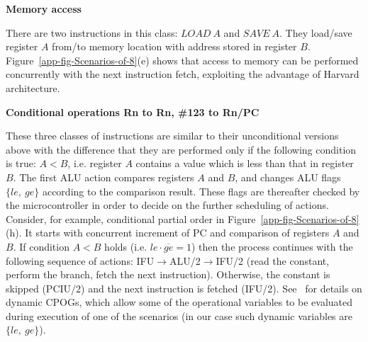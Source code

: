 \textbf{Memory access}

There are two instructions in this class: $\mathit{LOAD\ A}$ and
$\mathit{SAVE\ A}$. They load/save register $A$ from/to memory location
with address stored in register $B$. Figure~\ref{app-fig-Scenarios-of-8}(e)
shows that access to memory can be performed concurrently with the
next instruction fetch, exploiting the advantage of Harvard architecture.

\textbf{Conditional operations Rn to Rn, \#123 to Rn/PC}

These three classes of instructions are similar to their unconditional
versions above with the difference that they are performed only if
the following condition is true: $A<B$, i.e. register $A$ contains
a value which is less than that in register $B$. The first ALU action
compares registers $A$ and $B$, and changes ALU flags $\{le,\ ge\}$
according to the comparison result. These flags are thereafter checked
by the microcontroller in order to decide on the further scheduling
of actions. Consider, for example, conditional partial order in Figure~\ref{app-fig-Scenarios-of-8}(h).
It starts with concurrent increment of PC and comparison of registers
$A$ and $B$. If condition $A<B$ holds (i.e. $le\cdot\overline{ge}=1$)
then the process continues with the following sequence of actions:
IFU$\rightarrow$ALU/2$\rightarrow$IFU/2 (read the constant, perform
the branch, fetch the next instruction). Otherwise, the constant is
skipped (PCIU/2) and the next instruction is fetched (IFU/2). See~\cite{2009_mokhov_phd}
for details on dynamic CPOGs, which allow some of the operational
variables to be evaluated during execution of one of the scenarios
(in our case such dynamic variables are $\{le,\ ge\}$).

